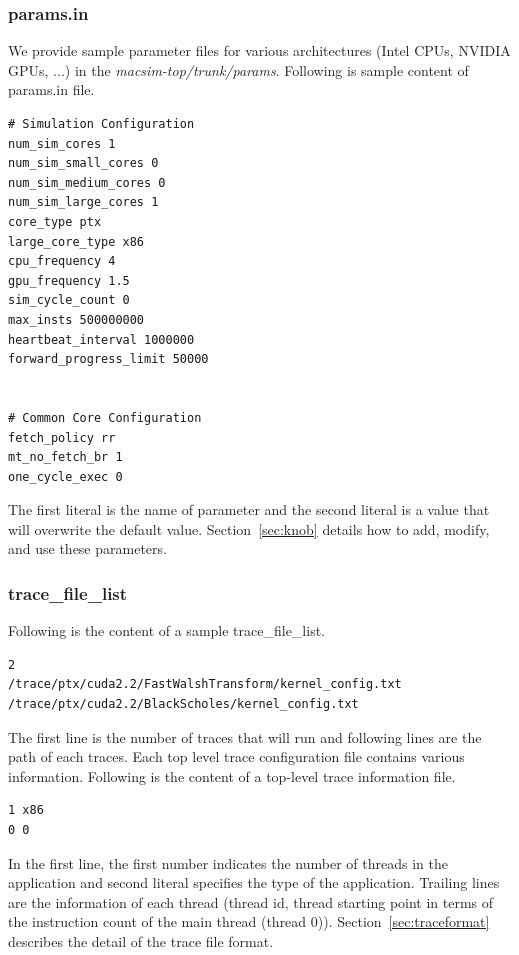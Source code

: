 \subsubsection{params.in}

We provide sample parameter files for various architectures (Intel
CPUs, NVIDIA GPUs, ...) in
the \textit{macsim-top/trunk/params}. Following is sample content of
params.in file.

\begin{Verbatim}
# Simulation Configuration
num_sim_cores 1
num_sim_small_cores 0
num_sim_medium_cores 0
num_sim_large_cores 1
core_type ptx
large_core_type x86
cpu_frequency 4
gpu_frequency 1.5
sim_cycle_count 0
max_insts 500000000
heartbeat_interval 1000000
forward_progress_limit 50000


# Common Core Configuration
fetch_policy rr
mt_no_fetch_br 1
one_cycle_exec 0
\end{Verbatim}

The first literal is the name of parameter and the second literal is a
value that will overwrite the default value. Section~\ref{sec:knob}
details how to add, modify, and use these parameters.


\subsubsection{trace\_file\_list}
\label{sec:trace_file_list}

Following is the content of a sample trace\_file\_list.

\begin{Verbatim}
2
/trace/ptx/cuda2.2/FastWalshTransform/kernel_config.txt
/trace/ptx/cuda2.2/BlackScholes/kernel_config.txt
\end{Verbatim}

The first line is the number of traces that \SIM will run and
following lines are the path of each traces. Each top level trace
configuration file contains various information. Following is the
content of a top-level trace information file.


\begin{Verbatim}
1 x86
0 0
\end{Verbatim}

In the first line, the first number indicates the number of threads in
the application and second literal specifies the type of the
application. Trailing lines are the information of each thread
({thread id}, {thread starting point in terms of the instruction count
  of the main thread (thread 0)}). Section~\ref{sec:traceformat}
describes the detail of the trace file format.



